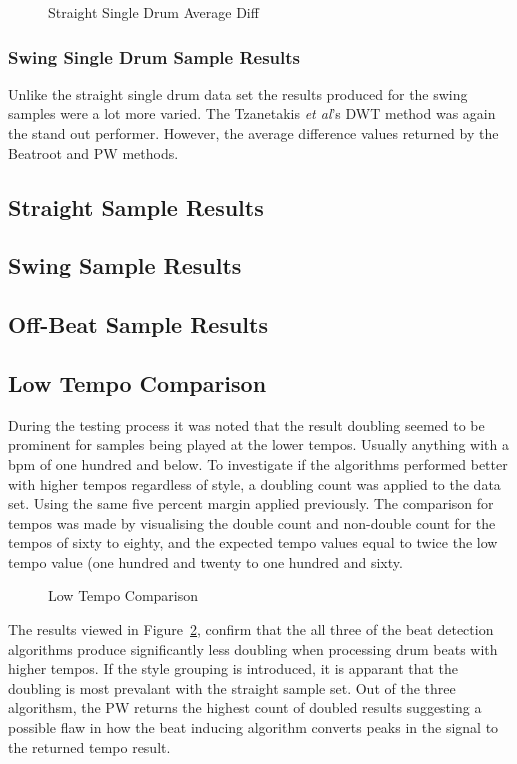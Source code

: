 \documentclass[a4paper, 11pt]{article}
\begin{document}
\begin{figure}
\caption{Straight Single Drum Average Diff}
\label{fig: ssdAveDiff}
\end{figure}

\subsubsection{Swing Single Drum Sample Results}

Unlike the straight single drum data set the results produced for the swing samples were a lot more varied. The Tzanetakis \textit{et al}'s \cite{tzane1} DWT method was again the stand out performer. However, the average difference values returned by the Beatroot and PW methods.

\subsection{Straight Sample Results}

\subsection{Swing Sample Results}

\subsection{Off-Beat Sample Results}

\subsection{Low Tempo Comparison}
During the testing process it was noted that the result doubling seemed to be prominent for samples being played at the lower tempos. Usually anything with a bpm of one hundred and below. To investigate if the algorithms performed better with higher tempos regardless of style, a doubling count was applied to the data set. Using the same five percent margin applied previously. The comparison for tempos was made by visualising the double count and non-double count for the tempos of sixty to eighty, and the expected tempo values equal to twice the low tempo value (one hundred and twenty to one hundred and sixty. 

\begin{figure}
\caption{Low Tempo Comparison}
\label{fig: lowTemCom}
\end{figure}

The results viewed in Figure~\ref{fig: lowTemCom}, confirm that the all three of the beat detection algorithms produce significantly less doubling when processing drum beats with higher tempos. If the style grouping is introduced, it is apparant that the doubling is most prevalant with the straight sample set. Out of the three algorithsm, the PW returns the highest count of doubled results suggesting a possible flaw in how the beat inducing algorithm converts peaks in the signal to the returned tempo result.
\end{document}
